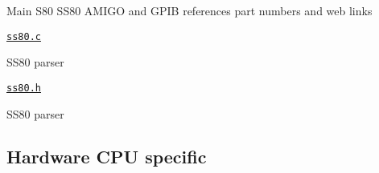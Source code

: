 \begin{DoxyItemize}
\begin{DoxyItemize}
\begin{DoxyItemize}
\item Main S80 S\+S80 A\+M\+I\+GO and G\+P\+IB references part numbers and web links
\end{DoxyItemize}
\item \href{gpib/ss80.c}{\tt ss80.\+c}
\begin{DoxyItemize}
\item S\+S80 parser
\end{DoxyItemize}
\item \href{gpib/ss80.h}{\tt ss80.\+h}
\begin{DoxyItemize}
\item S\+S80 parser
\end{DoxyItemize}
\end{DoxyItemize}
\end{DoxyItemize}

\subsection*{Hardware C\+PU specific}


